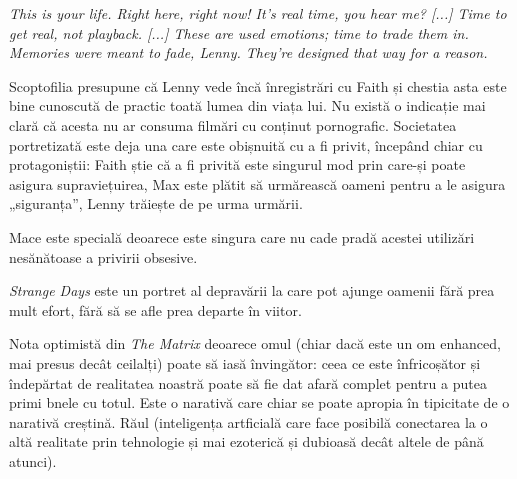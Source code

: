 \documentclass[12pt]{article}
\begin{document}
\begin{displayquote}
	\textit{This is your life. Right here, right now! It’s real time, you hear me? [...] Time to get real, not playback. [...] These are used emotions; time to trade them in. Memories were meant to fade, Lenny. They’re designed that way for a reason.}
\end{displayquote}

Scoptofilia presupune că Lenny vede încă înregistrări cu Faith și chestia asta este bine cunoscută de practic toată lumea din viața lui. Nu există o indicație mai clară că acesta nu ar consuma filmări cu conținut pornografic. Societatea portretizată este deja una care este obișnuită cu a fi privit, începând chiar cu protagoniștii: Faith știe că a fi privită este singurul mod prin care-și poate asigura supraviețuirea, Max este plătit să urmărească oameni pentru a le asigura „siguranța”, Lenny trăiește de pe urma urmării.\par

Mace este specială deoarece este singura care nu cade pradă acestei utilizări nesănătoase a privirii obsesive.

\textit{Strange Days} este un portret al depravării la care pot ajunge oamenii fără prea mult efort, fără să se afle prea departe în viitor.\par


 Nota optimistă din \textit{The Matrix} deoarece omul (chiar dacă este un om enhanced, mai presus decât ceilalți) poate să iasă învingător: ceea ce este înfricoșător și îndepărtat de realitatea noastră poate să fie dat afară complet pentru a putea primi bnele cu totul. Este o narativă care chiar se poate apropia în tipicitate de o narativă creștină. Răul (inteligența artficială care face posibilă conectarea la o altă realitate prin tehnologie și mai ezoterică și dubioasă decât altele de până atunci).\par





\printbibliography
\end{document}
